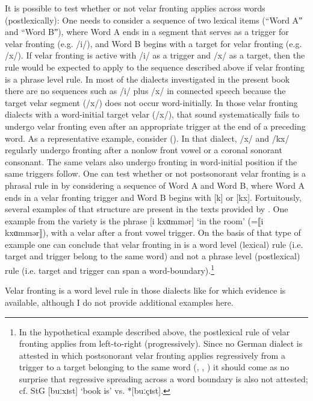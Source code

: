 It is possible to test whether or not velar fronting applies across words (postlexically): One needs to consider a sequence of two lexical items (“Word Aˮ and “Word Bˮ), where Word A ends in a segment that serves as a trigger for velar fronting (e.g. /i/), and Word B begins with a target for velar fronting (e.g. /x/). If velar fronting is active with /i/ as a trigger and /x/ as a target, then the rule would be expected to apply to the sequence described above if velar fronting is a phrase level rule. In most of the dialects investigated in the present book there are no sequences such as /i/ plus /x/ in connected speech because the target velar segment (/x/) does not occur word-initially. In those velar fronting dialects with a word-initial target velar (/x/), that sound systematically fails to undergo velar fronting even after an appropriate trigger at the end of a preceding word. As a representative example, consider  (). In that dialect, /x/ and /kx/ regularly undergo fronting after a nonlow front vowel or a coronal sonorant consonant. The same velars also undergo fronting in word-initial position if the same triggers follow. One can test whether or not postsonorant velar fronting is a phrasal rule in  by considering a sequence of Word A and Word B, where Word A ends in a velar fronting trigger and Word B begins with [k] or [kx]. Fortuitously, several examples of that structure are present in the texts provided by \citet[188-191]{Berger1913}. One example from the  variety is the phrase [i kxɑmmər] ‘in the room’ (=⟦i kxɑmmər⟧), with a velar after a front vowel trigger. On the basis of that type of example one can conclude that velar fronting in  is a word level (lexical) rule (i.e. target and trigger belong to the same word) and not a phrase level (postlexical) rule (i.e. target and trigger can span a word-boundary).\footnote{{In the hypothetical example described above, the postlexical rule of velar fronting applies from left-to-right (progressively). Since no German dialect is attested in which postsonorant velar fronting applies regressively from a trigger to a target belonging to the same word (, , ) it should come as no surprise that regressive spreading across a word boundary is also not attested; cf. StG [buːxɪst] ‘book is’ vs. *[buːçɪst].}}

Velar fronting is a word level rule in those dialects like  for which evidence is available, although I do not provide additional examples here.

